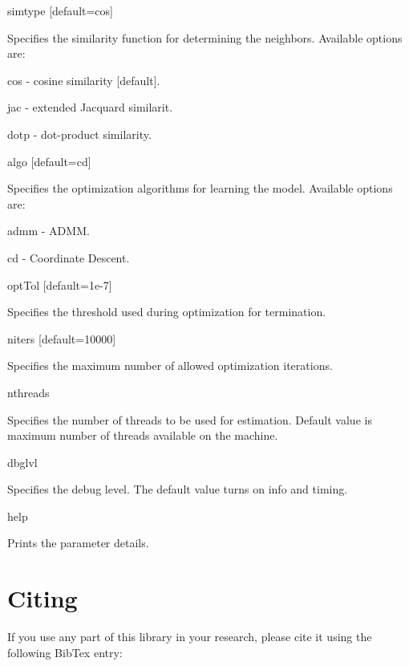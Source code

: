 \begin{DoxyItemize}
\begin{DoxyItemize}
\end{DoxyItemize}
\item simtype \mbox{[}default=cos\mbox{]}
\begin{DoxyItemize}
\item Specifies the similarity function for determining the neighbors. Available options are\+:
\begin{DoxyItemize}
\item cos -\/ cosine similarity \mbox{[}default\mbox{]}.
\item jac -\/ extended Jacquard similarit.
\item dotp -\/ dot-\/product similarity.
\end{DoxyItemize}
\end{DoxyItemize}
\item algo \mbox{[}default=cd\mbox{]}
\begin{DoxyItemize}
\item Specifies the optimization algorithms for learning the model. Available options are\+:
\begin{DoxyItemize}
\item admm -\/ A\+D\+MM.
\item cd -\/ Coordinate Descent.
\end{DoxyItemize}
\end{DoxyItemize}
\item opt\+Tol \mbox{[}default=1e-\/7\mbox{]}
\begin{DoxyItemize}
\item Specifies the threshold used during optimization for termination.
\end{DoxyItemize}
\item niters \mbox{[}default=10000\mbox{]}
\begin{DoxyItemize}
\item Specifies the maximum number of allowed optimization iterations.
\end{DoxyItemize}
\item nthreads
\begin{DoxyItemize}
\item Specifies the number of threads to be used for estimation. Default value is maximum number of threads available on the machine.
\end{DoxyItemize}
\item dbglvl
\begin{DoxyItemize}
\item Specifies the debug level. The default value turns on info and timing.
\end{DoxyItemize}
\item help
\begin{DoxyItemize}
\item Prints the parameter details.
\end{DoxyItemize}
\end{DoxyItemize}\hypertarget{index_Citing}{}\section{Citing}\label{index_Citing}
If you use any part of this library in your research, please cite it using the following Bib\+Tex entry\+:

